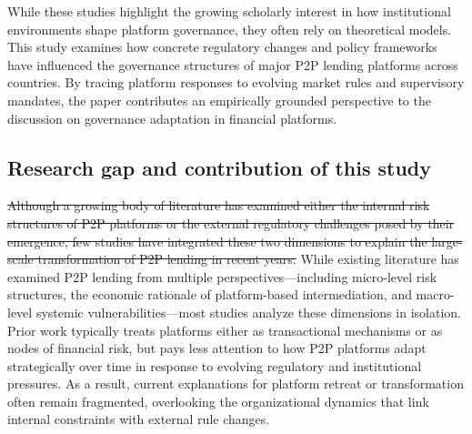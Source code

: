 \documentclass[pdflatex,sn-apa]{sn-jnl}%
\theoremstyle{thmstyleone}%
\theoremstyle{thmstyletwo}%
\theoremstyle{thmstylethree}%
\begin{document}
\textcolor{NavyBlue}{While these studies highlight the growing scholarly interest in how institutional environments shape platform governance, they often rely on theoretical models. This study examines how concrete regulatory changes and policy frameworks have influenced the governance structures of major P2P lending platforms across countries. By tracing platform responses to evolving market rules and supervisory mandates, the paper contributes an empirically grounded perspective to the discussion on governance adaptation in financial platforms.}

\subsection{Research gap and contribution of this study}

\sout{Although a growing body of literature has examined either the internal risk structures of P2P platforms or the external regulatory challenges posed by their emergence, few studies have integrated these two dimensions to explain the large-scale transformation of P2P lending in recent years.} \textcolor{NavyBlue}{While existing literature has examined P2P lending from multiple perspectives—including micro-level risk structures, the economic rationale of platform-based intermediation, and macro-level systemic vulnerabilities—most studies analyze these dimensions in isolation. Prior work typically treats platforms either as transactional mechanisms or as nodes of financial risk, but pays less attention to how P2P platforms adapt strategically over time in response to evolving regulatory and institutional pressures. As a result, current explanations for platform retreat or transformation often remain fragmented, overlooking the organizational dynamics that link internal constraints with external rule changes.}
\end{document}
